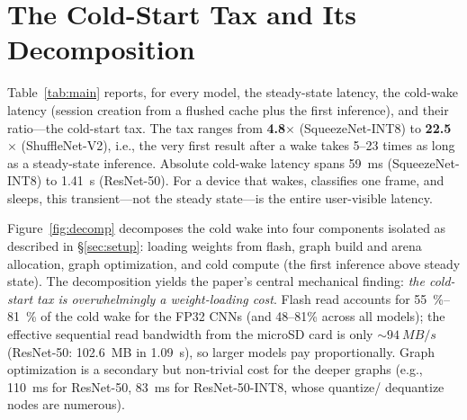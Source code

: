 \section{The Cold-Start Tax and Its Decomposition}\label{sec:decomp}
Table~\ref{tab:main} reports, for every model, the steady-state latency, the cold-wake latency
(session creation from a flushed cache plus the first inference), and their ratio---the
cold-start tax. The tax ranges from \textbf{4.8$\times$} (SqueezeNet-INT8) to
\textbf{22.5$\times$} (ShuffleNet-V2), i.e., the very first result after a wake takes 5--23 times
as long as a steady-state inference. Absolute cold-wake latency spans \SI{59}{ms}
(SqueezeNet-INT8) to \SI{1.41}{s} (ResNet-50). For a device that wakes, classifies one frame,
and sleeps, this transient---not the steady state---is the entire user-visible latency.

Figure~\ref{fig:decomp} decomposes the cold wake into four components isolated as described in
\S\ref{sec:setup}: loading weights from flash, graph build and arena allocation, graph
optimization, and cold compute (the first inference above steady state). The decomposition yields
the paper's central mechanical finding: \emph{the cold-start tax is overwhelmingly a
weight-loading cost}. Flash read accounts for \SIrange{55}{81}{\percent} of the cold wake for the
FP32 CNNs (and 48--81\% across all models); the effective sequential read bandwidth from the
microSD card is only ${\sim}\SI{94}{MB/s}$ (ResNet-50: \SI{102.6}{MB} in \SI{1.09}{s}), so larger
models pay proportionally. Graph optimization is a secondary but non-trivial cost for the deeper
graphs (e.g., \SI{110}{ms} for ResNet-50, \SI{83}{ms} for ResNet-50-INT8, whose quantize/
dequantize nodes are numerous).


